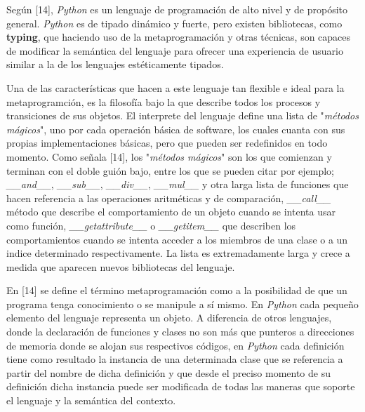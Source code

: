 Según [14], {\it Python} es un lenguaje de programación de alto nivel y de propósito general.
    {\it Python} es de tipado dinámico y fuerte, pero existen bibliotecas, como {\bf typing}, que haciendo
uso de la metaprogramación y otras técnicas, son capaces de modificar la semántica del
lenguaje para ofrecer una experiencia de usuario similar a la de los lenguajes estéticamente
tipados.

Una de las características que hacen a este lenguaje tan flexible e ideal para la metaprogramción,
es la filosofía bajo la que describe todos los procesos y transiciones de sus objetos. El
interprete del lenguaje define una lista de "{\it métodos mágicos}", uno por cada operación básica
de software, los cuales cuanta con sus propias implementaciones básicas, pero que pueden ser
redefinidos en todo momento. Como señala [14], los "{\it métodos mágicos}" son los que comienzan y
terminan con el doble guión bajo, entre los que se pueden citar por ejemplo;
{\it \_\_and\_\_}, {\it \_\_sub\_\_}, {\it \_\_div\_\_}, {\it \_\_mul\_\_} y otra larga lista de funciones que hacen referencia
a las operaciones aritméticas y de comparación, {\it\_\_call\_\_} método que describe el comportamiento
de un objeto cuando se intenta usar como función, {\it \_\_getattribute\_\_} o {\it \_\_getitem\_\_}
que describen los comportamientos cuando se intenta acceder a los miembros de una clase o a
un indice determinado respectivamente. La lista es extremadamente larga y crece a medida
que aparecen nuevos bibliotecas del lenguaje.

En [14] se define el término metaprogramación como a la posibilidad de que un programa tenga
conocimiento o se manipule a sí mismo. En {\it Python} cada pequeño elemento del lenguaje
representa un objeto. A diferencia de otros lenguajes, donde la declaración de funciones y
clases no son más que punteros a direcciones de memoria donde se alojan sus respectivos códigos,
en {\it Python} cada definición tiene como resultado la instancia de una determinada clase que se
referencia a partir del nombre de dicha definición y que desde el preciso momento de su
definición dicha instancia puede ser modificada de todas las maneras que soporte el lenguaje
y la semántica del contexto.

